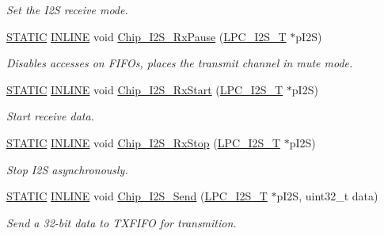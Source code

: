 \begin{DoxyCompactItemize}
\begin{DoxyCompactList}\small\item\em Set the I2S receive mode. \end{DoxyCompactList}\item 
\hyperlink{group__LPC__Types__Public__Macros_ga10b2d890d871e1489bb02b7e70d9bdfb}{S\+T\+A\+T\+IC} \hyperlink{group__LPC__Types__Public__Types_ga2eb6f9e0395b47b8d5e3eeae4fe0c116}{I\+N\+L\+I\+NE} void \hyperlink{group__I2S__17XX__40XX_ga0f7d40cc029ebd29091c0f3699bd1fe9}{Chip\+\_\+\+I2\+S\+\_\+\+Rx\+Pause} (\hyperlink{structLPC__I2S__T}{L\+P\+C\+\_\+\+I2\+S\+\_\+T} $\ast$p\+I2S)
\begin{DoxyCompactList}\small\item\em Disables accesses on F\+I\+F\+Os, places the transmit channel in mute mode. \end{DoxyCompactList}\item 
\hyperlink{group__LPC__Types__Public__Macros_ga10b2d890d871e1489bb02b7e70d9bdfb}{S\+T\+A\+T\+IC} \hyperlink{group__LPC__Types__Public__Types_ga2eb6f9e0395b47b8d5e3eeae4fe0c116}{I\+N\+L\+I\+NE} void \hyperlink{group__I2S__17XX__40XX_ga42eb351f08a2dea90fde3ba14d1698e3}{Chip\+\_\+\+I2\+S\+\_\+\+Rx\+Start} (\hyperlink{structLPC__I2S__T}{L\+P\+C\+\_\+\+I2\+S\+\_\+T} $\ast$p\+I2S)
\begin{DoxyCompactList}\small\item\em Start receive data. \end{DoxyCompactList}\item 
\hyperlink{group__LPC__Types__Public__Macros_ga10b2d890d871e1489bb02b7e70d9bdfb}{S\+T\+A\+T\+IC} \hyperlink{group__LPC__Types__Public__Types_ga2eb6f9e0395b47b8d5e3eeae4fe0c116}{I\+N\+L\+I\+NE} void \hyperlink{group__I2S__17XX__40XX_gaa78f387af78de456819cec21bbf21ada}{Chip\+\_\+\+I2\+S\+\_\+\+Rx\+Stop} (\hyperlink{structLPC__I2S__T}{L\+P\+C\+\_\+\+I2\+S\+\_\+T} $\ast$p\+I2S)
\begin{DoxyCompactList}\small\item\em Stop I2S asynchronously. \end{DoxyCompactList}\item 
\hyperlink{group__LPC__Types__Public__Macros_ga10b2d890d871e1489bb02b7e70d9bdfb}{S\+T\+A\+T\+IC} \hyperlink{group__LPC__Types__Public__Types_ga2eb6f9e0395b47b8d5e3eeae4fe0c116}{I\+N\+L\+I\+NE} void \hyperlink{group__I2S__17XX__40XX_ga7927122545d8ec1879743fb8caffb723}{Chip\+\_\+\+I2\+S\+\_\+\+Send} (\hyperlink{structLPC__I2S__T}{L\+P\+C\+\_\+\+I2\+S\+\_\+T} $\ast$p\+I2S, uint32\+\_\+t data)
\begin{DoxyCompactList}\small\item\em Send a 32-\/bit data to T\+X\+F\+I\+FO for transmition. \end{DoxyCompactList}\item 

\end{DoxyCompactItemize}
